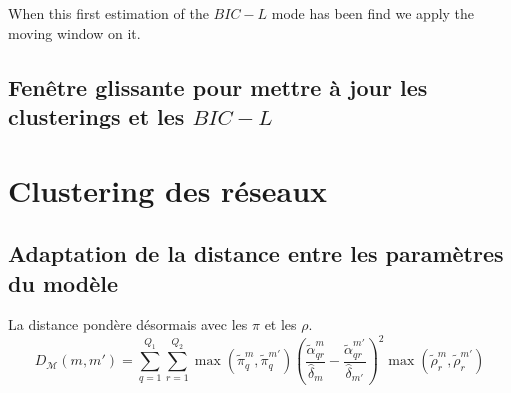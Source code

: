 \documentclass[12pt,a4paper]{rapport1}
\begin{document}

When this first estimation of the $BIC-L$ mode has been find we apply the moving
window on it.
\subsection{Fenêtre glissante pour mettre à jour les clusterings et les $BIC-L$}

\section{Clustering des réseaux}
\subsection{Adaptation de la distance entre les paramètres du modèle}
La distance pondère désormais avec les $\pi$ et les $\rho$.
\[ 
    D_{\mathcal{M}}(m,m') = \sum_{q = 1}^{Q_1} \sum_{r = 1}^{Q_2} \max(\widetilde{\pi}_{q}^{m}, \widetilde{\pi}_{q}^{m'}) \left( \frac{\widetilde{\alpha}_{qr}^{m}}{\widehat{\delta}_{m}} - \frac{\widetilde{\alpha}_{qr}^{m'}}{\widehat{\delta}_{m'}}\right)^{2} \max(\widetilde{\rho}_{r}^{m}, \widetilde{\rho}_{r}^{m'}) 
\]

\listoffigures
\listoftables
\end{document}
